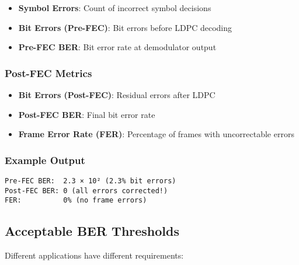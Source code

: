 \begin{itemize}
\tightlist
\item
  \textbf{Symbol Errors}: Count of incorrect symbol decisions
\item
  \textbf{Bit Errors (Pre-FEC)}: Bit errors before LDPC decoding
\item
  \textbf{Pre-FEC BER}: Bit error rate at demodulator output
\end{itemize}

\subsubsection{Post-FEC Metrics}\label{post-fec-metrics}

\begin{itemize}
\tightlist
\item
  \textbf{Bit Errors (Post-FEC)}: Residual errors after LDPC
\item
  \textbf{Post-FEC BER}: Final bit error rate
\item
  \textbf{Frame Error Rate (FER)}: Percentage of frames with
  uncorrectable errors
\end{itemize}

\subsubsection{Example Output}\label{example-output}

\begin{verbatim}
Pre-FEC BER:  2.3 × 10² (2.3% bit errors)
Post-FEC BER: 0 (all errors corrected!) 
FER:          0% (no frame errors)
\end{verbatim}

\subsection{Acceptable BER Thresholds}\label{acceptable-ber-thresholds}

Different applications have different requirements:


